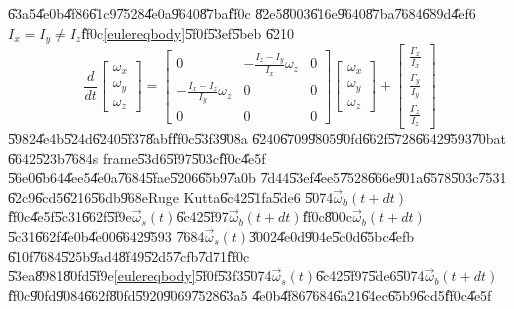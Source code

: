 \documentclass[12pt,a4paper]{article}
\begin{document}
\bigskip

\U{63a5}\U{4e0b}\U{4f86}\U{61c9}\U{7528}\U{4e0a}\U{9640}\U{87ba}\U{ff0c}%
\U{82e5}\U{8003}\U{616e}\U{9640}\U{87ba}\U{7684}\U{689d}\U{4ef6} $%
I_{x}=I_{y}\neq I_{z}$\U{ff0c}\ref{eulereqbody}\U{5f0f}\U{53ef}\U{5beb}%
\U{6210}%
\begin{equation}
\frac{d}{dt}\left[ 
\begin{array}{c}
\omega _{x} \\ 
\omega _{y} \\ 
\omega _{z}%
\end{array}%
\right] =\left[ 
\begin{array}{ccc}
0 & -\frac{I_{z}-I_{y}}{I_{x}}\omega _{z} & 0 \\ 
-\frac{I_{x}-I_{z}}{I_{y}}\omega _{z} & 0 & 0 \\ 
0 & 0 & 0%
\end{array}%
\right] \left[ 
\begin{array}{c}
\omega _{x} \\ 
\omega _{y} \\ 
\omega _{z}%
\end{array}%
\right] +\left[ 
\begin{array}{c}
\frac{\Gamma _{x}}{I_{x}} \\ 
\frac{\Gamma _{y}}{I_{y}} \\ 
\frac{\Gamma _{z}}{I_{z}}%
\end{array}%
\right]  \label{numerical_euler_eq}
\end{equation}%
\U{5982}\U{4e4b}\U{524d}\U{6240}\U{5f37}\U{8abf}\U{ff0c}\U{53f3}\U{908a}%
\U{6240}\U{6709}\U{9805}\U{90fd}\U{662f}\U{5728}\U{6642}\U{9593}\U{70ba}t%
\U{6642}\U{523b}\U{7684}s frame\U{53d6}\U{5f97}\U{503c}\U{ff0c}\U{4e5f}%
\U{56e0}\U{6b64}\U{4ee5}\U{4e0a}\U{7684}\U{5fae}\U{5206}\U{65b9}\U{7a0b}%
\U{7d44}\U{53ef}\U{4ee5}\U{7528}\U{666e}\U{901a}\U{6578}\U{503c}\U{7531}%
\U{62c9}\U{6cd5}\U{6216}\U{56db}\U{968e}Ruge Kutta\U{6c42}\U{51fa}\U{5de6}%
\U{5074}$\vec{\omega}_{b}(t+dt)$\U{ff0c}\U{4e5f}\U{5c31}\U{662f}\U{5f9e}$%
\vec{\omega}_{s}(t)$\U{6c42}\U{5f97}$\vec{\omega}_{b}(t+dt)$\U{ff0c}\U{800c}$%
\vec{\omega}_{b}(t+dt)$\U{5c31}\U{662f}\U{4e0b}\U{4e00}\U{6642}\U{9593}%
\U{7684}$\vec{\omega}_{s}(t)$\U{3002}\U{4e0d}\U{904e}\U{5c0d}\U{65bc}\U{4efb}%
\U{610f}\U{7684}\U{525b}\U{9ad4}\U{8f49}\U{52d5}\U{7cfb}\U{7d71}\U{ff0c}%
\U{53ea}\U{8981}\U{80fd}\U{5f9e}\ref{eulereqbody}\U{5f0f}\U{53f3}\U{5074}$%
\vec{\omega}_{s}(t)$\U{6c42}\U{5f97}\U{5de6}\U{5074}$\vec{\omega}_{b}(t+dt)$%
\U{ff0c}\U{90fd}\U{9084}\U{662f}\U{80fd}\U{5920}\U{9069}\U{7528}\U{63a5}%
\U{4e0b}\U{4f86}\U{7684}\U{6a21}\U{64ec}\U{65b9}\U{6cd5}\U{ff0c}\U{4e5f}%
\end{document}
